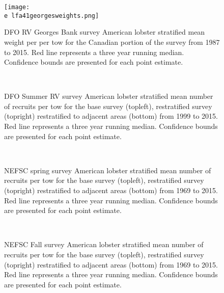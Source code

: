 \documentclass[11pt]{article}
\newcommand{\e}{/backup/bio_data/bio.lobster/figures/} %
\begin{document}
\begin{figure}

    \texttt{[image: \\e lfa41georgesweights.png]}
    \caption{DFO RV Georges Bank survey American lobster stratified mean weight per per tow for the Canadian portion of the survey from 1987 to 2015. Red line represents a three year running median. Confidence bounds are presented for each point estimate.}

\end{figure}


\begin{figure}
\centering
{}
\\

\caption{DFO Summer RV survey American lobster stratified mean number of recruits per tow for the base survey (topleft), restratified survey (topright) restratified to adjacent areas (bottom) from 1999 to 2015. Red line represents a three year running median. Confidence bounds are presented for each point estimate.}
\end{figure}
\clearpage



\begin{figure}
\centering
{}
\\

\caption{NEFSC spring survey American lobster stratified mean number of recruits per tow for the base survey (topleft), restratified survey (topright) restratified to adjacent areas (bottom) from 1969 to 2015. Red line represents a three year running median. Confidence bounds are presented for each point estimate. }
\end{figure}
\clearpage



\begin{figure}
\centering
{}
\\

\caption{NEFSC Fall survey American lobster stratified mean number of recruits per tow for the base survey (topleft), restratified survey (topright) restratified to adjacent areas (bottom) from 1969 to 2015. Red line represents a three year running median. Confidence bounds are presented for each point estimate. }
\end{figure}
\clearpage
\end{document}
